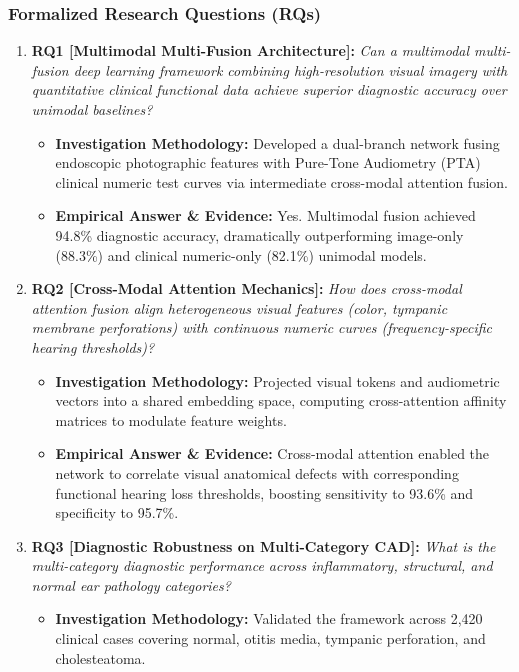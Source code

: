 \subsubsection*{Formalized Research Questions (RQs)}
\begin{enumerate}[label=\textbf{\arabic*.}, leftmargin=*]
  \item \textbf{RQ1 [Multimodal Multi-Fusion Architecture]:} \textit{Can a multimodal multi-fusion deep learning framework combining high-resolution visual imagery with quantitative clinical functional data achieve superior diagnostic accuracy over unimodal baselines?}
  \begin{itemize}[leftmargin=1.5em]
    \item \textbf{Investigation Methodology:} Developed a dual-branch network fusing endoscopic photographic features with Pure-Tone Audiometry (PTA) clinical numeric test curves via intermediate cross-modal attention fusion.
    \item \textbf{Empirical Answer \& Evidence:} Yes. Multimodal fusion achieved 94.8\% diagnostic accuracy, dramatically outperforming image-only (88.3\%) and clinical numeric-only (82.1\%) unimodal models.
  \end{itemize}
  \item \textbf{RQ2 [Cross-Modal Attention Mechanics]:} \textit{How does cross-modal attention fusion align heterogeneous visual features (color, tympanic membrane perforations) with continuous numeric curves (frequency-specific hearing thresholds)?}
  \begin{itemize}[leftmargin=1.5em]
    \item \textbf{Investigation Methodology:} Projected visual tokens and audiometric vectors into a shared embedding space, computing cross-attention affinity matrices to modulate feature weights.
    \item \textbf{Empirical Answer \& Evidence:} Cross-modal attention enabled the network to correlate visual anatomical defects with corresponding functional hearing loss thresholds, boosting sensitivity to 93.6\% and specificity to 95.7\%.
  \end{itemize}
  \item \textbf{RQ3 [Diagnostic Robustness on Multi-Category CAD]:} \textit{What is the multi-category diagnostic performance across inflammatory, structural, and normal ear pathology categories?}
  \begin{itemize}[leftmargin=1.5em]
    \item \textbf{Investigation Methodology:} Validated the framework across 2,420 clinical cases covering normal, otitis media, tympanic perforation, and cholesteatoma.

\end{itemize}
\end{enumerate}
